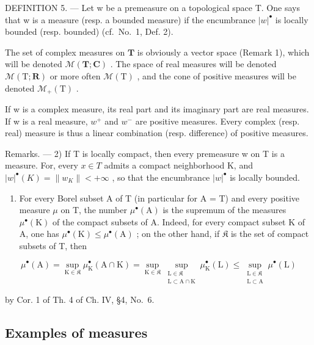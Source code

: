 DEFINITION 5. --- Let w be a premeasure on a topological space T. One says that w is a measure (resp. a bounded measure) if the encumbrance \(|w|^{\bullet}\) is locally bounded (resp. bounded) (cf.~No.~1, Def. 2).

The set of complex measures on \(\mathbf{T}\) is obviously a vector space (Remark 1), which will be denoted \(\mathcal{M}(\mathbf{T};\mathbf{C})\) . The space of real measures will be denoted \(\mathcal{M}(\mathrm{T};\mathbf{R})\) or more often \(\mathcal{M}(\mathrm{T})\) , and the cone of positive measures will be denoted \(\mathcal{M}_{+}(\mathrm{T})\) .

If w is a complex measure, its real part and its imaginary part are real measures. If w is a real measure, \(w^{+}\) and \(w^{-}\) are positive measures. Every complex (resp. real) measure is thus a linear combination (resp. difference) of positive measures.

Remarks. --- 2) If T is locally compact, then every premeasure w on T is a measure. For, every \(x \in T\) admits a compact neighborhood K, and \(|w|^{\bullet}(K) = \|w_{K}\| < +\infty\) , so that the encumbrance \(|w|^{\bullet}\) is locally bounded.

\begin{enumerate}
\def\labelenumi{\arabic{enumi})}
\setcounter{enumi}{2}
\tightlist
\item
  For every Borel subset A of T (in particular for A = T) and every positive measure \(\mu\) on T, the number \(\mu^{\bullet}(\mathrm{A})\) is the supremum of the measures \(\mu^{\bullet}(\mathrm{K})\) of the compact subsets of A. Indeed, for every compact subset K of A, one has \(\mu^{\bullet}(\mathrm{K}) \leqslant \mu^{\bullet}(\mathrm{A})\) ; on the other hand, if \(\mathfrak{K}\) is the set of compact subsets of T, then
\end{enumerate}

\[
\mu^{\bullet}(\mathrm{A}) = \sup_{\mathrm{K}\in \mathfrak{K}}\mu_{\mathrm{K}}^{\bullet}(\mathrm{A}\cap \mathrm{K}) = \sup_{\mathrm{K}\in \mathfrak{K}}\sup_{\substack{\mathrm{L}\in \mathfrak{K}\\ \mathrm{L}\subset \mathrm{A}\cap \mathrm{K}}}\mu_{\mathrm{K}}^{\bullet}(\mathrm{L})\leqslant \sup_{\substack{\mathrm{L}\in \mathfrak{K}\\ \mathrm{L}\subset \mathrm{A}}}\mu^{\bullet}(\mathrm{L})
\]

by Cor. 1 of Th. 4 of Ch. IV, §4, No.~6.

\subsection{Examples of measures}

